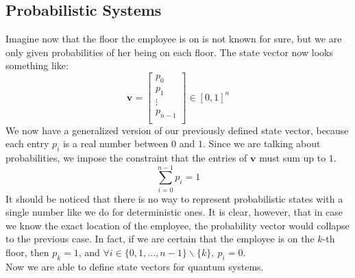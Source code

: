 \documentclass[12pt,a4paper]{report}
\theoremstyle{definition}
\theoremstyle{definition}
\theoremstyle{definition}
\begin{document}
\subsection{Probabilistic Systems}
Imagine now that the floor the employee is on is not known for sure, but we are only given probabilities of her being on each floor. The state vector now looks something like:
\begin{equation*}
    \mathbf{v}=\begin{bmatrix}
        p_0\\
        p_1\\
        \vdots\\
        p_{n-1}\\
    \end{bmatrix}\in [0,1]^n
\end{equation*}
We now have a generalized version of our previously defined state vector, because each entry $p_i$ is a real number between $0$ and $1$. Since we are talking about probabilities, we impose the constraint that the entries of $\mathbf{v}$ must sum up to $1$.
\begin{equation*}
    \sum_{i=0}^{n-1} p_i = 1
\end{equation*}
It should be noticed that there is no way to represent probabilistic states with a single number like we do for deterministic ones. It is clear, however, that in case we know the exact location of the employee, the probability vector would collapse to the previous case. In fact, if we are certain that the employee is on the $k$-th floor, then $p_k=1$, and $\forall i \in \{0,1,\ldots,n-1\} \smallsetminus \{k\},\ p_i=0$.\\
Now we are able to define state vectors for quantum systems.
\end{document}
